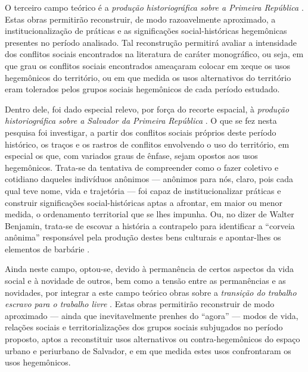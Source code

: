 O terceiro campo teórico é a \textit{produção historiográfica sobre a Primeira República} \cite{BRUNO1967, carone_evolucao_1977, CARONE1970inst, faoro_donos_2001, freyre_ordem_2004, janotti_subversivos_1986, leal_coronelismo_2012, LINS1988coro, PEDROSA1966a, PEDROSA1966b, pires_eleicoes_1995, saes_classemedia_1975, silva_historiaeconomica_2002}. Estas obras permitirão reconstruir, de modo razoavelmente aproximado, a institucionalização de práticas \cite{BERNARDO1991} e as significações social-históricas \cite{CASTORIADIS1982} hegemônicas presentes no período analisado. Tal reconstrução permitirá avaliar a intensidade dos conflitos sociais encontrados na literatura de caráter monográfico, ou seja, em que grau os conflitos sociais encontrados ameaçaram colocar em xeque os usos hegemônicos do território, ou em que medida os usos alternativos do território eram tolerados pelos grupos sociais hegemônicos de cada período estudado.

Dentro dele, foi dado especial relevo, por força do recorte espacial, à \textit{produção historiográfica sobre a Salvador da Primeira República} \cite{araujo_inventario_1992, castellucci_maquina_2008, CUNHA2011, sampaio_partidos_1978, sampaio_legislativo_1985, santos_associacao_1985, pang_coronelismo_1979}. O que se fez nesta pesquisa foi investigar, a partir dos conflitos sociais próprios deste período histórico, os traços e os rastros de conflitos envolvendo o uso do território, em especial os que, com variados graus de ênfase, sejam opostos aos usos hegemônicos. Trata-se da tentativa de compreender como o fazer coletivo e cotidiano daqueles indivíduos anônimos --- anônimos para nós, claro, pois cada qual teve nome, vida e trajetória --- foi capaz de institucionalizar práticas \cite{BERNARDO1991} e construir significações social-históricas \cite{CASTORIADIS1982} aptas a afrontar, em maior ou menor medida, o ordenamento territorial que se lhes impunha. Ou, no dizer de Walter Benjamin, trata-se de escovar a história a contrapelo para identificar a ``corveia anônima'' responsável pela produção destes bens culturais e apontar-lhes os elementos de barbárie \cite[p.~225]{BENJAMIN1987}.

Ainda neste campo, optou-se, devido à permanência de certos aspectos da vida social e à novidade de outros, bem como a tensão entre as permanências e as novidades, por integrar a este campo teórico obras sobre a \textit{transição do trabalho escravo para o trabalho livre }\cite{ANDRADE1988, AZEVEDO2004, brito2003abolicao, COSTA1991, DIAS2004, HOLTHE2003, mata2007libertos, MATTOS2008, MATTOSO1978, MATTOSO1992, MATTOSO1988, menezesfilho2007pos, MOURA1981, NASCIMENTO2007, REIS2000, REIS2004males, REISGOMES1996, REISSILVA1989, REIS2012, COSTA1989}. Estas obras permitirão reconstruir de modo aproximado --- ainda que inevitavelmente prenhes do ``agora'' \cite[p.~229-230]{BENJAMIN1987} --- modos de vida, relações sociais e territorializações dos grupos sociais subjugados no período proposto, aptos a reconstituir usos alternativos ou contra-hegemônicos do espaço urbano e periurbano de Salvador, e em que medida estes usos confrontaram os usos hegemônicos.

